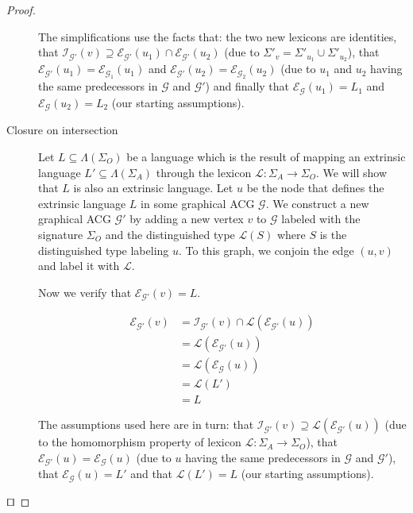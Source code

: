\documentclass{llncs}
\begin{document}
\begin{proof}
\begin{description}
      The simplifications use the facts that: the two new lexicons are
      identities, that $\mathcal{I}_{\mathcal{G}'}(v) \supseteq
      \mathcal{E}_{\mathcal{G}'}(u_1) \cap \mathcal{E}_{\mathcal{G}'}(u_2)$
      (due to $\Sigma'_v = \Sigma'_{u_1} \cup \Sigma'_{u_2}$), that
      $\mathcal{E}_{\mathcal{G}'}(u_1) = \mathcal{E}_{\mathcal{G}_1}(u_1)$ and
      $\mathcal{E}_{\mathcal{G}'}(u_2) = \mathcal{E}_{\mathcal{G}_2}(u_2)$
      (due to $u_1$ and $u_2$ having the same predecessors in $\mathcal{G}$
      and $\mathcal{G}'$) and finally that $\mathcal{E}_{\mathcal{G}}(u_1) =
      L_1$ and $\mathcal{E}_{\mathcal{G}}(u_2) = L_2$ (our starting
      assumptions).

  \vspace{5mm}

  \item[Closure on intersection] Let $L \subseteq \Lambda(\Sigma_O)$ be a
    language which is the result of mapping an extrinsic language $L'
    \subseteq \Lambda(\Sigma_A)$ through the lexicon $\mathcal{L} : \Sigma_A
    \to \Sigma_O$. We will show that $L$ is also an extrinsic language. Let
    $u$ be the node that defines the extrinsic language $L$ in some graphical
    ACG $\mathcal{G}$. We construct a new graphical ACG $\mathcal{G}'$ by
    adding a new vertex $v$ to $\mathcal{G}$ labeled with the signature
    $\Sigma_O$ and the distinguished type $\mathcal{L}(S)$ where $S$ is the
    distinguished type labeling $u$. To this graph, we conjoin the edge
    $(u,v)$ and label it with $\mathcal{L}$.

    Now we verify that $\mathcal{E}_{\mathcal{G}'}(v) = L$.

    \begin{align*}
      \mathcal{E}_{\mathcal{G}'}(v) &= \mathcal{I}_{\mathcal{G}'}(v) \cap
      \mathcal{L}(\mathcal{E}_{\mathcal{G}'}(u)) \\
      &= \mathcal{L}(\mathcal{E}_{\mathcal{G}'}(u)) \\
      &= \mathcal{L}(\mathcal{E}_{\mathcal{G}}(u)) \\
      &= \mathcal{L}(L') \\
      &= L
    \end{align*}

    The assumptions used here are in turn: that $\mathcal{I}_{\mathcal{G}'}(v)
    \supseteq \mathcal{L}(\mathcal{E}_{\mathcal{G}'}(u))$ (due to the
    homomorphism property of lexicon $\mathcal{L} : \Sigma_A \to \Sigma_O$),
    that $\mathcal{E}_{\mathcal{G}'}(u) = \mathcal{E}_{\mathcal{G}}(u)$ (due
    to $u$ having the same predecessors in $\mathcal{G}$ and $\mathcal{G}'$),
    that $\mathcal{E}_{\mathcal{G}}(u) = L'$ and that $\mathcal{L}(L') = L$
    (our starting assumptions).
  \end{description}
\hfill $\qed$
\end{proof}
\end{document}
